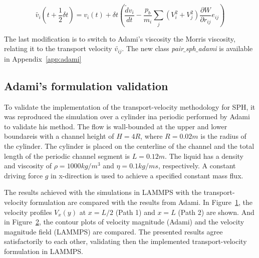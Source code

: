\begin{equation}
\tilde {v_{i}}(t+\frac{1}{2}\delta t) = v_{i}(t) + \delta t \left( \frac{\tilde {d}v_{i}}{dt} - \frac{p_{b}}{m_{i}} \sum_{j} (V^2_{i} + V^2_{j}) \frac {\partial W}{\partial r_{ij}}e_{ij}\right)
\end{equation}

The last modification is to switch to Adami's viscosity the Morris viscosity, relating it to the transport velocity $\tilde {v_{ij}}$. The new class \textit{pair$\_$sph$\_$adami}
is available in Appendix~\ref{app:adami}

\subsection{Adami's formulation validation}
\label{sec:section 1}

To validate the implementation of the transport-velocity methodology for SPH, it was reproduced the simulation over a cylinder ina periodic performed by Adami
\cite{adami_transport-velocity_2013} to validate his method. The flow is wall-bounded at the upper and lower boundareis with a channel height of $H=4R$, where $R=0.02m$ is the 
radius of the cylinder. The cylinder is placed on the centerline of the channel and the total length of the periodic channel segment is $L=0.12m$. The liquid has a density and
viscosity of $\rho = 1000 kg/m^3$ and $\eta = 0.1 kg/ms$, respectively. A constant driving force $g$ in x-direction is used to achieve a specified constant mass flux.\par
The results achieved with the simulations in LAMMPS with the transport-velocity formulation are compared with the results from Adami. In Figure~\ref{fig:Bild3.13}, the velocity profiles
$V_{x}(y)$ at $x = L/2$ (Path 1) and $x=L$ (Path 2) are shown. And in Figure~\ref{fig:Bild3.14}, the contour plots of velocity magnitude (Adami) and the velocity magnitude field (LAMMPS)
are  compared. The presented results agree satisfactorily to each other, validating then the implemented transport-velocity formulation in LAMMPS.

\begin{figure}[H]
\centering
  \begin{footnotesize}
  
  \caption[]{}
  \label{fig:Bild3.13}
  \end{footnotesize}
\end{figure} 



\begin{figure}[H]
\centering
  \begin{footnotesize}
  
  \caption[]{}
  \label{fig:Bild3.14}
  \end{footnotesize}
\end{figure} 



